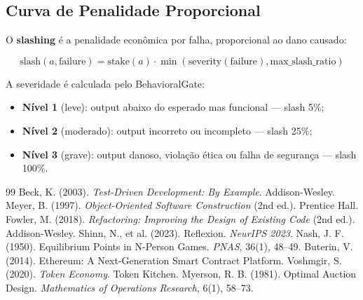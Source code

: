 \subsection{Curva de Penalidade Proporcional}

O \textbf{slashing} é a penalidade econômica por falha, proporcional ao dano causado:

\begin{equation}
\text{slash}(a, \text{failure}) = \text{stake}(a) \cdot \min\left(\text{severity}(\text{failure}), \text{max\_slash\_ratio}\right)
\label{eq:slashing}
\end{equation}

A severidade é calculada pelo BehavioralGate:
\begin{itemize}
    \item \textbf{Nível 1} (leve): output abaixo do esperado mas funcional — slash 5\%;
    \item \textbf{Nível 2} (moderado): output incorreto ou incompleto — slash 25\%;
    \item \textbf{Nível 3} (grave): output danoso, violação ética ou falha de segurança — slash 100\%.
\end{itemize}

\begin{thebibliography}{99}
 Beck, K. (2003). \textit{Test-Driven Development: By Example}. Addison-Wesley.
 Meyer, B. (1997). \textit{Object-Oriented Software Construction} (2nd ed.). Prentice Hall.
 Fowler, M. (2018). \textit{Refactoring: Improving the Design of Existing Code} (2nd ed.). Addison-Wesley.
 Shinn, N., et al. (2023). Reflexion. \textit{NeurIPS 2023}. 
 Nash, J. F. (1950). Equilibrium Points in N-Person Games. \textit{PNAS}, 36(1), 48--49. 
 Buterin, V. (2014). Ethereum: A Next-Generation Smart Contract Platform.
 Voshmgir, S. (2020). \textit{Token Economy}. Token Kitchen.
 Myerson, R. B. (1981). Optimal Auction Design. \textit{Mathematics of Operations Research}, 6(1), 58--73. 
\end{thebibliography}
